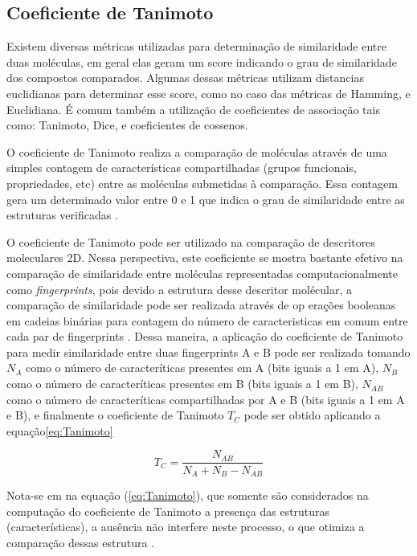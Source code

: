\subsection{Coeficiente de Tanimoto}

Existem diversas métricas utilizadas para determinação de similaridade entre duas
moléculas, em geral elas geram um score indicando o grau de similaridade dos compostos comparados. Algumas dessas métricas utilizam distancias euclidianas para determinar esse 
score, como no caso das métricas de Hamming, e Euclidiana. É comum também a utilização 
de coeficientes de associação tais como: Tanimoto, Dice, e coeficientes de cossenos.

O coeficiente de Tanimoto realiza a comparação de moléculas através de uma simples contagem de características compartilhadas (grupos funcionais, propriedades, etc) entre as moléculas submetidas à comparação. Essa contagem gera um determinado valor entre 0 e 1 que indica o grau de similaridade entre as estruturas verificadas \cite{Dogra2007}.

O coeficiente de Tanimoto pode ser utilizado na comparação de descritores moleculares 2D. Nessa perspectiva, este coeficiente se mostra bastante efetivo na comparação de similaridade entre moléculas representadas computacionalmente como \textit{fingerprints}, pois devido a estrutura desse descritor molécular, a comparação de similaridade pode ser realizada através de op
erações booleanas em cadeias binárias para contagem do número de caracteristicas em comum entre cada par de fingerprints \cite{willett2003similarity}. Dessa maneira, a aplicação do coeficiente de Tanimoto para medir similaridade entre duas fingerprints A e B pode ser realizada tomando $N_{A}$ como o número de caracteríticas presentes em A (bits iguais a 1 em A), $N_{B}$ como o número de caracteríticas presentes em B (bits iguais a 1 em B), $N_{AB}$ como o número de caracteríticas compartilhadas por A e B (bits iguais a 1 em A e B), e finalmente o coeficiente de Tanimoto $T_{C}$ pode ser obtido aplicando a equação\eqref{eq:Tanimoto} 

\begin{equation}
T_{C} =\frac{N_{AB}}{N_{A}+N_{B} - N_{AB}}
\label{eq:Tanimoto}
\end{equation}

Nota-se em na equação (\ref{eq:Tanimoto}), que somente são considerados na computação do 
coeficiente de Tanimoto a presença das estruturas (características), a ausência não interfere 
neste processo, o que otimiza a comparação dessas estrutura \cite{Dogra2007}.

